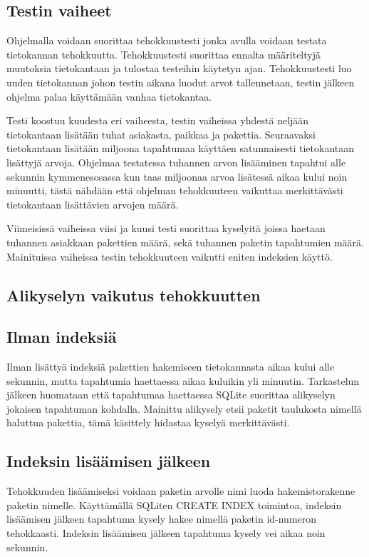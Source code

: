 \documentclass[11pt,a4paper]{article}
\begin{document}
\subsection{Testin vaiheet}
Ohjelmalla voidaan suorittaa tehokkuustesti jonka avulla voidaan testata tietokannan tehokkuutta. Tehokkuustesti suorittaa ennalta määriteltyjä muutoksia tietokantaan ja tulostaa testeihin käytetyn ajan. Tehokkuustesti luo uuden tietokannan johon testin aikana luodut arvot tallennetaan, testin jälkeen ohjelma palaa käyttämään vanhaa tietokantaa.

Testi koostuu kuudesta eri vaiheesta, testin vaiheissa yhdestä neljään tietokantaan lisätään tuhat asiakasta, paikkaa ja pakettia. Seuraavaksi tietokantaan lisätään miljoona tapahtumaa käyttäen satunnaisesti tietokantaan lisättyjä arvoja. Ohjelmaa testatessa tuhannen arvon lisääminen tapahtui alle sekunnin kymmenesosassa kun taas miljoonaa arvoa lisätessä aikaa kului noin minuutti, tästä nähdään että ohjelman tehokkuuteen vaikuttaa merkittävästi tietokantaan lisättävien arvojen määrä. 

Viimeisissä vaiheissa viisi ja kuusi testi suorittaa kyselyitä joissa haetaan tuhannen asiakkaan pakettien määrä, sekä tuhannen paketin tapahtumien määrä. Mainituissa vaiheissa testin tehokkuuteen vaikutti eniten indeksien käyttö.

\subsection{Alikyselyn vaikutus tehokkuutten}


\subsection{Ilman indeksiä}
Ilman lisättyä indeksiä pakettien hakemiseen tietokannasta aikaa kului alle sekunnin, mutta tapahtumia haettaessa aikaa kuluikin yli minuutin. Tarkastelun jälkeen huomataan että tapahtumaa haettaessa SQLite suorittaa alikyselyn jokaisen tapahtuman kohdalla. Mainittu alikysely etsii paketit taulukosta nimellä haluttua pakettia, tämä käsittely hidastaa kyselyä merkittävästi.

\subsection{Indeksin lisäämisen jälkeen}
Tehokkuuden lisäämiseksi voidaan paketin arvolle nimi luoda hakemistorakenne paketin nimelle. Käyttämällä SQLiten CREATE INDEX toimintoa, indeksin lisäämisen jälkeen tapahtuma kysely hakee nimellä paketin id-numeron tehokkaasti. Indeksin lisäämisen jälkeen tapahtuma kysely vei aikaa noin sekunnin.
\end{document}
